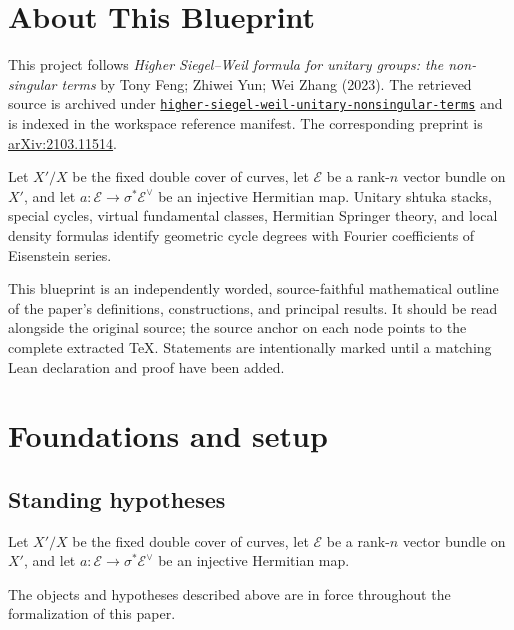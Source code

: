 

\chapter*{About This Blueprint}
\label{higher-siegel-weil-unitary-nonsingular-terms-about}

This project follows \emph{Higher Siegel--Weil formula for unitary groups: the non-singular terms} by Tony Feng; Zhiwei Yun; Wei Zhang (2023). The
retrieved source is archived under
\href{../../../../../references/higher-siegel-weil-unitary-nonsingular-terms/}{\texttt{higher-siegel-weil-unitary-nonsingular-terms}} and is indexed in
the workspace reference manifest. The corresponding preprint is
\href{https://arxiv.org/abs/2103.11514}{arXiv:2103.11514}.

Let $X'/X$ be the fixed double cover of curves, let $\mathcal E$ be a rank-$n$ vector bundle on $X'$, and let $a:\mathcal E\to\sigma^*\mathcal E^\vee$ be an injective Hermitian map. Unitary shtuka stacks, special cycles, virtual fundamental classes, Hermitian Springer theory, and local density formulas identify geometric cycle degrees with Fourier coefficients of Eisenstein series.

This blueprint is an independently worded, source-faithful mathematical
outline of the paper's definitions, constructions, and principal results. It
should be read alongside the original source; the source anchor on each node
points to the complete extracted TeX. Statements are intentionally marked
\notready until a matching Lean declaration and proof have been added.

\chapter{Foundations and setup}
\label{chap:higher-siegel-weil-unitary-nonsingular-terms-foundations}

\section{Standing hypotheses}
\label{sec:higher-siegel-weil-unitary-nonsingular-terms-standing}

Let $X'/X$ be the fixed double cover of curves, let $\mathcal E$ be a rank-$n$ vector bundle on $X'$, and let $a:\mathcal E\to\sigma^*\mathcal E^\vee$ be an injective Hermitian map.

\begin{convention}
\label{higher-siegel-weil-unitary-nonsingular-terms-setup}
The objects and hypotheses described above are in force throughout the
formalization of this paper.
\notready
\end{convention}

